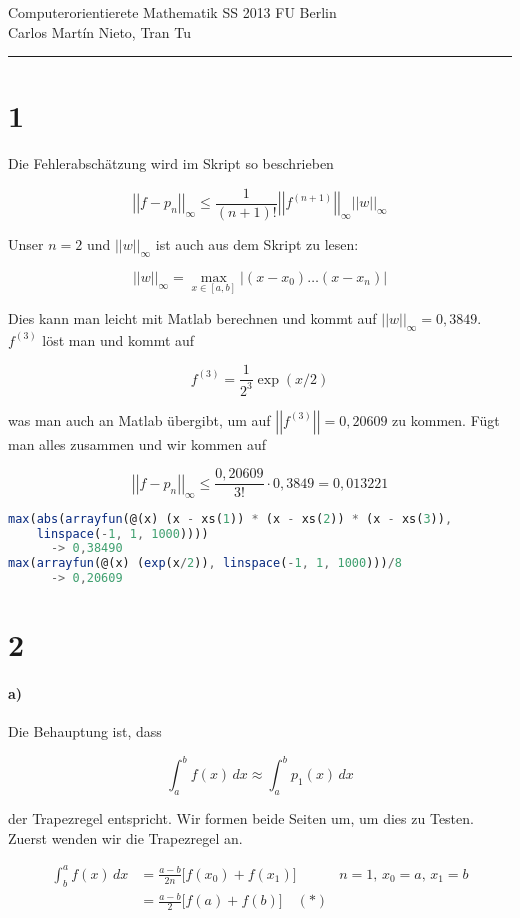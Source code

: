 \documentclass[ngerman,a4paper]{scrartcl}
\newcommand{\norm}[1]{\left|\!\left|#1\right|\! \right|}
\begin{document}
{\sffamily
  \hfill
  Computerorientierete Mathematik SS 2013\hfill
  FU Berlin\\[8pt]
  \hfill Carlos Martín Nieto, Tran Tu\hrule \bigskip
}

\section*{1}

Die Fehlerabschätzung wird im Skript so beschrieben

\[
\norm{f - p_n}_\infty \leq \frac{1}{(n+1)!} \norm{f^{(n+1)}}_\infty \norm{w}_\infty
\]

Unser $n=2$ und $\norm{w}_\infty$ ist auch aus dem Skript zu lesen:

\[
\norm{w}_\infty = \max_{x\in [a,b]} \left|(x-x_0) \dots (x-x_n)\right|
\]

Dies kann man leicht mit Matlab berechnen und kommt auf
$\norm{w}_\infty = 0,3849$. $f^{(3)}$ löst man und kommt auf

\[
f^{(3)} = \frac{1}{2^3} \exp(x/2)
\]

was man auch an Matlab übergibt, um auf $\norm{f^{(3)}} = 0,20609$ zu
kommen. Fügt man alles zusammen und wir kommen auf

\[
\norm{f - p_n}_\infty \leq \frac{0,20609}{3!} \cdot 0,3849 = \boxed{0,013221}
\]

\begin{lstlisting}[language=octave]
max(abs(arrayfun(@(x) (x - xs(1)) * (x - xs(2)) * (x - xs(3)),
    linspace(-1, 1, 1000))))
      -> 0,38490
max(arrayfun(@(x) (exp(x/2)), linspace(-1, 1, 1000)))/8
      -> 0,20609
\end{lstlisting}

\section*{2}

\paragraph{a)}

Die Behauptung ist, dass 

\[
\int^b_a f(x)\, dx \approx \int^b_a p_1(x)\, dx
\]

der Trapezregel entspricht. Wir formen beide Seiten um, um dies zu
Testen. Zuerst wenden wir die Trapezregel an.

\begin{align*}
  \int^a_b f(x)\, dx &= \frac{a-b}{2n} \big[ f(x_0) + f(x_1) \big] & n
  = 1,\, x_0 = a,\, x_1 = b\\
  &= \frac{a-b}{2} \big[f(a) + f(b)\big] \quad (*)
\end{align*}
\end{document}
